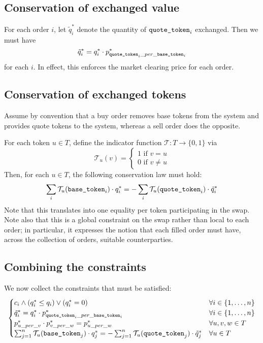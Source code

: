 \documentclass[11pt, reqno]{amsart}
\newcommand{\basetoken}{\textnormal{\texttt{base\_token}}}
\newcommand{\quotetoken}{\textnormal{\texttt{quote\_token}}}
\begin{document}
\subsection{Conservation of exchanged value}

For each order $i$, let $\tilde{q}_i^*$ denote the quantity of
$\quotetoken_i$ exchanged. Then we must have
\[
    \tilde{q}_i^* = q_i^* \cdot p_{\quotetoken_i\_per\_\basetoken_i}^*
\]
for each $i$. In effect, this enforces the market clearing price for each
order.

\subsection{Conservation of exchanged tokens}

Assume by convention that a buy order removes base tokens from the system and
provides quote tokens to the system, whereas a sell order does the opposite.

For each token $u \in T$, define the indicator function
$\mathcal{T}: T \to \{0, 1\}$ via
\[
    \mathcal{T}_u(v) =
    \begin{cases}
    1 \text{ if } v = u \\
    0 \text{ if } v \neq u
    \end{cases}
\]
Then, for each $u \in T$, the following conservation law must hold:
\[
    \sum_i \mathcal{T}_u(\basetoken_i) \cdot q^*_i
    =
    - \sum_i \mathcal{T}_u(\quotetoken_i) \cdot \tilde{q}_i^*
\]
Note that this translates into one equality per token participating in the
swap. Note also that this is a global constraint on the swap rather than local
to each order;
in particular, it expresses the notion that each filled order must have,
across the collection of orders, suitable counterparties.

\subsection{Combining the constraints}

We now collect the constraints that must be satisfied:
\begin{equation}
  \begin{cases}
    c_i \land (q_i^* \leq q_i) \lor (q_i^* = 0)
      & \forall i \in \{1, \ldots, n\} \\
    \tilde{q}_i^* = q_i^* \cdot p_{\quotetoken_i\_per\_\basetoken_i}^*
      & \forall i \in \{1, \ldots, n\} \\
    p^*_{u\_per\_v} \cdot p^*_{v\_per\_w} = p^*_{u\_per\_w}
      & \forall u, v, w \in T \\
    \sum_{j = 1}^n \mathcal{T}_u(\basetoken_j) \cdot q^*_j
    =
      - \sum_{j = 1}^n \mathcal{T}_u(\quotetoken_j) \cdot \tilde{q}_j^*
      & \forall u \in T
  \end{cases}
\end{equation}
\end{document}
